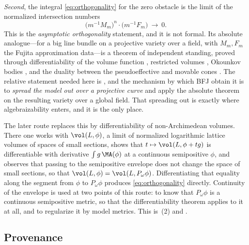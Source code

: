 \emph{Second}, the integral \eqref{eq:orthogonality} for the zero obstacle
is the limit of the normalized intersection numbers
\begin{equation}\label{eq:ch27-asymptotic-orthogonality}
 \bigl(m^{-1}M_m\bigr)^n\cdot\bigl(m^{-1}F_m\bigr)
 \ \longrightarrow\ 0 .
\end{equation}
This is the \emph{asymptotic orthogonality} statement, and it is not formal.
Its absolute analogue---for a big line bundle on a projective variety over a
field, with \(M_m,F_m\) the Fujita approximation data---is a theorem of
independent standing, proved through differentiability of the volume
function \cite{BFJ09}, restricted volumes \cite{ELMNP09}, Okounkov bodies
\cite{LM09}, and the duality between the pseudoeffective and movable cones
\cite{BDPP13}.  The relative statement needed here is
\cite[Appendix~A]{BFJ15}, and the mechanism by which BFJ obtain it is to
\emph{spread the model out over a projective curve} and apply the absolute
theorem on the resulting variety over a global field.  That spreading out
is exactly where algebraizability enters, and it is the only place.

The later route replaces this by differentiability of non-Archimedean
volumes.  There one works with
\(\vol(L,\phi)\), a limit of normalized logarithmic lattice volumes of
spaces of small sections, shows that
\(t\mapsto\vol(L,\phi+tg)\) is differentiable with derivative
\(\int g\,\MA(\phi)\) at a continuous semipositive \(\phi\), and observes
that passing to the semipositive envelope does not change the space of small
sections, so that \(\vol(L,\phi)=\vol(L,P_\omega\phi)\).  Differentiating
that equality along the segment from \(\phi\) to \(P_\omega\phi\) produces
\eqref{eq:orthogonality} directly.  Continuity of the envelope is used at
two points of this route: to know that \(P_\omega\phi\) is a continuous
semipositive metric, so that the differentiability theorem applies to it at
all, and to regularize it by model metrics.  This is
\,(2) and
.

\subsection{Provenance}
\label{sec:ch27-orthogonality-provenance}

